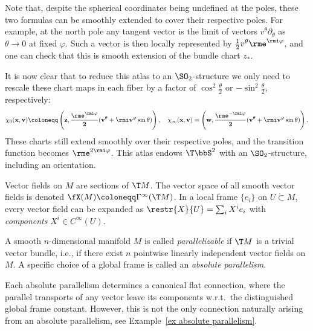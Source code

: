 \begin{example}
    Note that, despite the spherical coordinates being undefined at the poles, these two formulas can be smoothly extended to cover their respective poles. For example, at the north pole any tangent vector is the limit of vectors $v^\theta\partial_\theta$ as $\theta\to 0$ at fixed $\varphi$. Such a vector is then locally represented by $\frac12 v^\theta \rme^{\rmi\varphi}$, and one can check that this is smooth extension of the bundle chart $z_\ast$.

    It is now clear that to reduce this atlas to an $\SO_2$-structure we only need to rescale these chart maps in each fiber by a factor of $\cos^2\frac{\theta}{2}$ or $-\sin^2\frac{\theta}{2}$, respectively:
    \[\chi_0(\bf{x},\bf{v})\coloneqq \left(z,\frac{\rme^{\rmi\varphi}}{2}(v^\theta+\rmi v^\varphi\sin\theta) \right),\quad \chi_\infty(\bf{x},\bf{v})=\left(w,\frac{\rme^{-\rmi\varphi}}{2}(v^\theta+\rmi v^\varphi\sin\theta )\right).\] 
    These charts still extend smoothly over their respective poles, and the transition function becomes $\rme^{2\rmi\varphi}$. This atlas endows $\T\bbS^2$ with an $\SO_2$-structure, including an orientation.
\end{example}


\begin{defn}
    Vector fields on $M$ are sections of $\T M$. The vector space of all smooth vector fields is denoted $\fX(M)\coloneqq \Gamma^\infty(\T M)$. In a local frame $\{e_i\}$ on $U\mathring{\subset}M$, every vector field can be expanded as $\restr{X}{U}=\sum_i X^i e_i$ with \emph{components} $X^i\in C^\infty(U)$.
\end{defn}

\begin{defn}[Parallelism]\label{def parallelizable}
    A smooth $n$-dimensional manifold $M$ is called \emph{parallelizable} if $\T M$ is a trivial vector bundle, i.e., if there exist $n$ pointwise linearly independent vector fields on $M$. A specific choice of a global frame is called an \emph{absolute parallelism}.
\end{defn}

\begin{rem}
     Each absolute parallelism determines a canonical flat connection, where the parallel transports of any vector leave its components w.r.t.\ the distinguished global frame constant. However, this is not the only connection naturally arising from an absolute parallelism, see Example~\ref{ex absolute parallelism}.
\end{rem}


